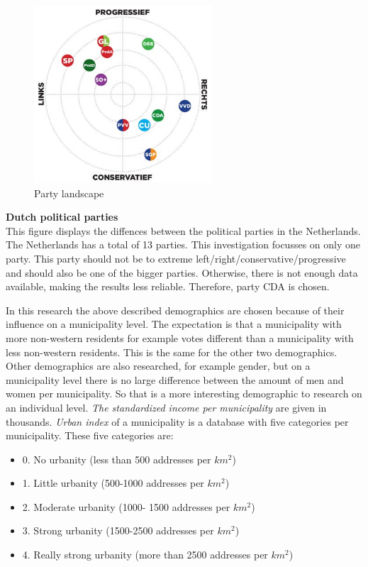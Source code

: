 \documentclass[11pt,]{article}
\begin{document}
\begin{figure}
\centering
\includegraphics[width=2.60417in]{Partijlandschap.jpg}
\caption{Party landscape}
\end{figure}

\textbf{Dutch political parties}\\
This figure displays the diffences between the political parties in the
Netherlands. The Netherlands has a total of 13 parties. This
investigation focusses on only one party. This party should not be to
extreme left/right/conservative/progressive and should also be one of
the bigger parties. Otherwise, there is not enough data available,
making the results less reliable. Therefore, party CDA is chosen.

In this research the above described demographics are chosen because of
their influence on a municipality level. The expectation is that a
municipality with more non-western residents for example votes different
than a municipality with less non-western residents. This is the same
for the other two demographics. Other demographics are also researched,
for example gender, but on a municipality level there is no large
difference between the amount of men and women per municipality. So that
is a more interesting demographic to research on an individual level.
\emph{The standardized income per municipality} are given in thousands.
\emph{Urban index} of a municipality is a database with five categories
per municipality. These five categories are:

\begin{itemize}
\item 0. No urbanity (less than 500 addresses per $km^2$)
\item 1. Little urbanity (500-1000 addresses per $km^2$)
\item 2. Moderate urbanity (1000- 1500 addresses per $km^2$)
\item 3. Strong urbanity (1500-2500 addresses per $km^2$) 
\item 4. Really strong urbanity (more than 2500 addresses per $km^2$)
\end{itemize}
\end{document}
